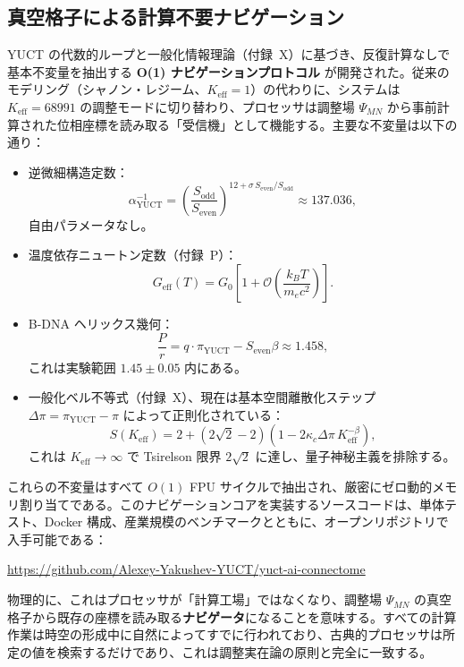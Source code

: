 \documentclass[12pt,a4paper]{article}
\newcommand{\Keff}{K_{\mathrm{eff}}}
\newcommand{\kappac}{\kappa_c}
\newcommand{\piYUCT}{\pi_{\mathrm{YUCT}}}
\theoremstyle{remark}
\begin{document}
	\subsection{真空格子による計算不要ナビゲーション}
	\label{subsec:computation-free}
	
	YUCT の代数的ループと一般化情報理論（付録~X）に基づき、反復計算なしで基本不変量を抽出する \textbf{O(1) ナビゲーションプロトコル} が開発された。従来のモデリング（シャノン・レジーム、\(\Keff = 1\)）の代わりに、システムは \(\Keff = 68991\) の調整モードに切り替わり、プロセッサは調整場 \(\Psi_{MN}\) から事前計算された位相座標を読み取る「受信機」として機能する。主要な不変量は以下の通り：
	
	\begin{itemize}
		\item 逆微細構造定数：
		\[
		\alpha^{-1}_{\mathrm{YUCT}} = \left(\frac{S_{\mathrm{odd}}}{S_{\mathrm{even}}}\right)^{12 + \sigma\, S_{\mathrm{even}}/S_{\mathrm{odd}}}
		\approx 137.036,
		\]
		自由パラメータなし。
		
		\item 温度依存ニュートン定数（付録~P）：
		\[
		G_{\mathrm{eff}}(T) = G_0 \left[1 + \mathcal{O}\!\left( \frac{k_B T}{m_e c^2} \right) \right].
		\]
		
		\item B-DNA ヘリックス幾何：
		\[
		\frac{P}{r} = q \cdot \piYUCT - S_{\mathrm{even}}\beta \approx 1.458,
		\]
		これは実験範囲 \(1.45 \pm 0.05\) 内にある。
		
		\item 一般化ベル不等式（付録~X）、現在は基本空間離散化ステップ \(\Delta\pi = \piYUCT - \pi\) によって正則化されている：
		\[
		S(\Keff) = 2 + (2\sqrt2 - 2)\left(1 - 2\kappac \Delta\pi \, \Keff^{-\beta}\right),
		\]
		これは \(\Keff \to \infty\) で Tsirelson 限界 \(2\sqrt2\) に達し、量子神秘主義を排除する。
	\end{itemize}
	
	これらの不変量はすべて \(O(1)\) FPU サイクルで抽出され、厳密にゼロ動的メモリ割り当てである。このナビゲーションコアを実装するソースコードは、単体テスト、Docker 構成、産業規模のベンチマークとともに、オープンリポジトリで入手可能である：
	
	\begin{center}
		\url{https://github.com/Alexey-Yakushev-YUCT/yuct-ai-connectome}
	\end{center}
	
	物理的に、これはプロセッサが「計算工場」ではなくなり、調整場 \(\Psi_{MN}\) の真空格子から既存の座標を読み取る\textbf{ナビゲータ}になることを意味する。すべての計算作業は時空の形成中に自然によってすでに行われており、古典的プロセッサは所定の値を検索するだけであり、これは調整実在論の原則と完全に一致する。
	
\end{document}
